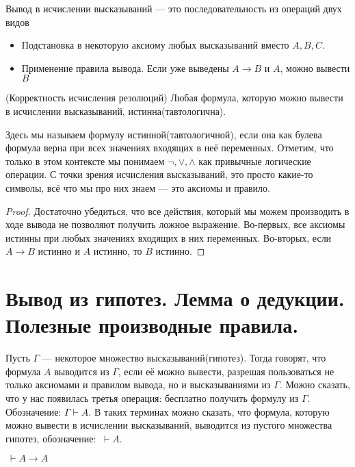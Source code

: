 \documentclass{article}
\begin{document}
Вывод в исчислении высказываний --- это последовательность из операций двух видов
\begin{itemize}
	\item Подстановка в некоторую аксиому любых высказываний вместо \(A, B, C\).
	\item Применение правила вывода. Если уже выведены \(A\to B\) и \(A\), можно вывести \(B\)
\end{itemize}

\begin{theorem}{(Корректность исчисления резолюций)}
	Любая формула, которую можно вывести в исчислении высказываний, истинна(тавтологична).
\end{theorem}
Здесь мы называем формулу истинной(тавтологичной), если она как булева формула верна при всех значениях входящих в неё переменных. Отметим, что только в этом контексте мы понимаем \(\lnot, \lor, \land\) как привычные логические операции. С точки зрения исчисления высказываний, это просто какие-то символы, всё что мы про них знаем --- это аксиомы и правило.
\begin{proof}
	Достаточно убедиться, что все действия, который мы можем производить в ходе вывода не позволяют получить ложное выражение. Во-первых, все аксиомы истинны при любых значениях входящих в них переменных. Во-вторых, если \(A \to B\) истинно и \(A\) истинно, то \(B\) истинно.
\end{proof}

\section{Вывод из гипотез. Лемма о дедукции. Полезные производные правила.}
Пусть \(\Gamma\) --- некоторое множество высказываний(гипотез). Тогда говорят, что формула \(A\) выводится из \(\Gamma\), если её можно вывести,  разрешая пользоваться не только аксиомами и правилом вывода, но и высказываниями из \(\Gamma\). Можно сказать, что у нас появилась третья операция: бесплатно получить формулу из \(\Gamma\). Обозначение: \(\Gamma \vdash A\). В таких терминах можно сказать, что формула, которую можно вывести в исчислении высказываний,  выводится из пустого множества гипотез, обозначение: \(\ \vdash A\).

\begin{lemma}
	\(\ \vdash A \to A\)
\end{lemma}
\end{document}

